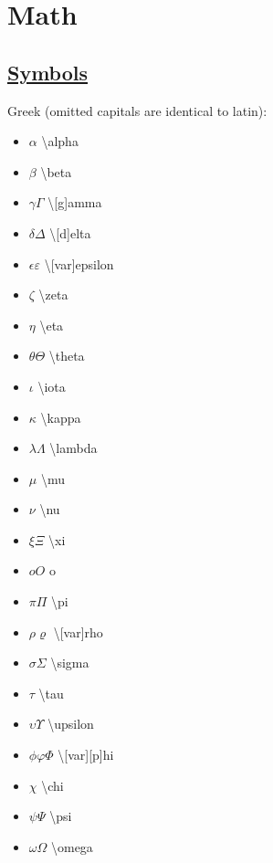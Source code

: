 \section{Math}

\subsection*{\href{https://en.wikipedia.org/wiki/List_of_mathematical_symbols_by_subject#Vector_calculus}{Symbols}}
Greek (omitted capitals are identical to latin): \\
\begin{minipage}{3cm}
\begin{itemize}[label={}]
    \item  $\alpha$ \textbackslash alpha
    \item $\beta$ \textbackslash beta 
    \item $\gamma\Gamma$ \textbackslash [g]amma 
    \item $\delta\Delta$ \textbackslash [d]elta 
    \item $\epsilon\varepsilon$ \textbackslash [var]epsilon 
    \item $\zeta$ \textbackslash zeta 
    \item $\eta$ \textbackslash eta
    \item $\theta\Theta$ \textbackslash theta 
    \item $\iota$ \textbackslash iota 
    \item $\kappa$ \textbackslash kappa 
    \item $\lambda\Lambda$ \textbackslash lambda 
    \item $\mu$ \textbackslash mu 
\end{itemize} 
\end{minipage}
\begin{minipage}{3cm}
\begin{itemize}[label={}]
    \item $\nu$ \textbackslash nu 
    \item $\xi\Xi$ \textbackslash xi 
    \item $oO$ o 
    \item $\pi\Pi$ \textbackslash pi 
    \item $\rho\varrho$ \textbackslash [var]rho 
    \item $\sigma\Sigma$ \textbackslash sigma 
    \item $\tau$ \textbackslash tau 
    \item $\upsilon\Upsilon$ \textbackslash upsilon 
    \item $\phi\varphi\Phi$ \textbackslash [var][p]hi 
    \item $\chi$ \textbackslash chi 
    \item $\psi\Psi$ \textbackslash psi 
    \item $\omega\Omega$ \textbackslash omega 
\end{itemize} 
\end{minipage} \\

